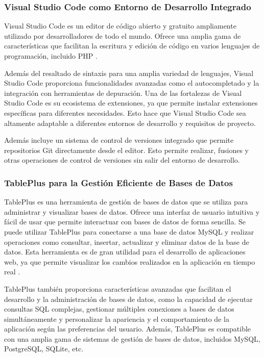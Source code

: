 \subsubsection{Visual Studio Code como Entorno de Desarrollo Integrado}
Visual Studio Code es un editor de código abierto y gratuito ampliamente utilizado por desarrolladores de todo el mundo. Ofrece una amplia gama de características que facilitan la escritura y edición de código en varios lenguajes de programación, incluido PHP \cite{vscode}. 

Además del resaltado de sintaxis para una amplia variedad de lenguajes, Visual Studio Code proporciona funcionalidades avanzadas como el autocompletado y la integración con herramientas de depuración. Una de las fortalezas de Visual Studio Code es su ecosistema de extensiones, ya que permite instalar extensiones específicas para diferentes necesidades. Esto hace que Visual Studio Code sea altamente adaptable a diferentes entornos de desarrollo y requisitos de proyecto.

Además incluye un sistema de control de versiones integrado que permite repositorios Git directamente desde el editor. Esto permite realizar, fusiones y otras operaciones de control de versiones sin salir del entorno de desarrollo.


\subsubsection{TablePlus para la Gestión Eficiente de Bases de Datos}
TablePlus es una herramienta de gestión de bases de datos que se utiliza para administrar y visualizar bases de datos. Ofrece una interfaz de usuario intuitiva y fácil de usar que permite interactuar con bases de datos de forma sencilla. Se puede utilizar TablePlus para conectarse a una base de datos MySQL y realizar operaciones como consultar, insertar, actualizar y eliminar datos de la base de datos. Esta herramienta es de gran utilidad para el desarrollo de aplicaciones web, ya que permite visualizar los cambios realizados en la aplicación en tiempo real \cite{tableplus}.

TablePlus también proporciona características avanzadas que facilitan el desarrollo y la administración de bases de datos, como la capacidad de ejecutar consultas SQL complejas, gestionar múltiples conexiones a bases de datos simultáneamente y personalizar la apariencia y el comportamiento de la aplicación según las preferencias del usuario. Además, TablePlus es compatible con una amplia gama de sistemas de gestión de bases de datos, incluidos MySQL, PostgreSQL, SQLite, etc.


